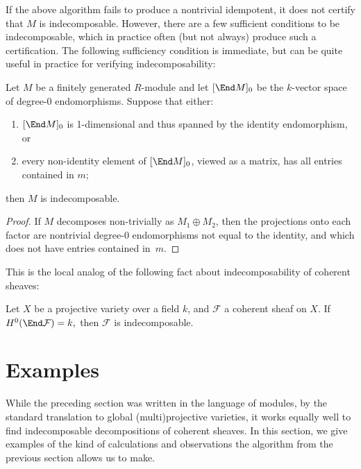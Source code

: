 \documentclass{article}
\def\F{\mathcal F}
\numberwithin{equation}{section}
\theoremstyle{theorem}
\numberwithin{thm}{section}
\theoremstyle{definition}
\begin{document}
If the above algorithm fails to produce a nontrivial idempotent, it does not certify that $M$ is indecomposable. However, there are a few sufficient conditions to be indecomposable, which in practice often (but not always) produce such a certification.
The following sufficiency condition is immediate, but can be quite useful in practice for verifying indecomposability:

\begin{lem}
  Let $M$ be a finitely generated $R$-module and let $[\End M]_0$ be the $k$-vector space of degree-0 endomorphisms. Suppose that either:
  \begin{enumerate}
  \item $[\End M]_0$ is 1-dimensional and thus spanned by the identity endomorphism, or
  \item every non-identity element of $[\End M]_0$, viewed as a matrix, has all entries contained in $m$;
  \end{enumerate}
  then $M$ is indecomposable.
\end{lem}
\begin{proof}
  If $M$ decomposes non-trivially as $M_1\oplus M_2$, then the projections onto each factor are nontrivial degree-0 endomorphisms not equal to the identity, and which does not have entries contained in~$m$.
\end{proof}

This is the local analog of the following fact about indecomposability of coherent sheaves:

\begin{cor}
  Let $X$ be a projective variety over a field $k$, and $\F$ a coherent sheaf on $X$.
  If $ H^0(\End \F) = k, $ then $\F$ is indecomposable.
\end{cor}


\section{Examples}

While the preceding section was written in the language of modules, by the standard translation to global (multi)projective varieties, it works equally well to find indecomposable decompositions of coherent sheaves.
In this section, we give examples of the kind of calculations and observations the algorithm from the previous section allows us to make.

\renewcommand{\char}{\operatorname{char}}
\end{document}
